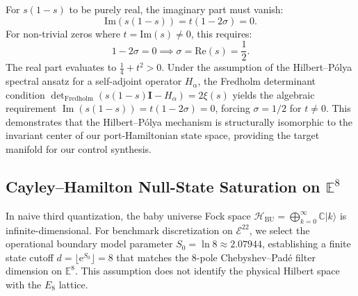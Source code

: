 \documentclass[11pt,a4paper,reqno]{article}
\theoremstyle{plain}
\theoremstyle{definition}
\theoremstyle{remark}
\numberwithin{equation}{section}
\newcommand{\C}{\mathbb{C}}
\newcommand{\Hbu}{\mathcal{H}_{\mathrm{BU}}}
\begin{document}
For $s(1 - s)$ to be purely real, the imaginary part must vanish:
\begin{equation}
  \mathrm{Im}\left( s(1 - s) \right) = t (1 - 2\sigma) = 0.
  \label{eq:imaginary_part_zero}
\end{equation}
For non-trivial zeros where $t = \mathrm{Im}(s) \neq 0$, this requires:
\begin{equation}
  1 - 2\sigma = 0 \implies \sigma = \mathrm{Re}(s) = \frac{1}{2}.
  \label{eq:critical_axis_exact}
\end{equation}
The real part evaluates to $\frac{1}{4} + t^2 > 0$. Under the assumption of the Hilbert--P\'{o}lya spectral ansatz for a self-adjoint operator $H_\alpha$, the Fredholm determinant condition $\det_{\mathrm{Fredholm}}(s(1-s)\mathbf{I} - H_\alpha) = 2\xi(s)$ yields the algebraic requirement $\operatorname{Im}(s(1-s)) = t(1-2\sigma) = 0$, forcing $\sigma = 1/2$ for $t \ne 0$. This demonstrates that the Hilbert--P\'{o}lya mechanism is structurally isomorphic to the invariant center of our port-Hamiltonian state space, providing the target manifold for our control synthesis.

\subsection{Cayley--Hamilton Null-State Saturation on \texorpdfstring{$\mathbb{E}^8$}{E8}}
In naive third quantization, the baby universe Fock space $\Hbu = \bigoplus_{k=0}^\infty \C |k\rangle$ is infinite-dimensional. For benchmark discretization on $\mathcal{E}^{22}$, we select the operational boundary model parameter $S_0 = \ln 8 \approx 2.07944$, establishing a finite state cutoff $d = \lfloor \mathrm{e}^{S_0} \rfloor = 8$ that matches the 8-pole Chebyshev--Pad\'{e} filter dimension on $\mathbb{E}^8$. This assumption does not identify the physical Hilbert space with the $E_8$ lattice.
\end{document}
